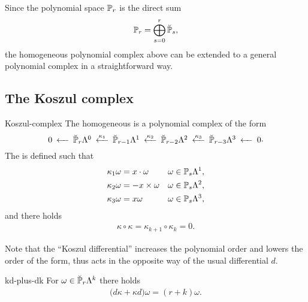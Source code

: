 \begin{remark}
  Since the polynomial space $\P_r$ is the direct sum
  \begin{gather*}
    \P_r = \bigoplus_{s=0}^r \breve\P_s,
  \end{gather*}
  the homogeneous polynomial complex above can be extended to a
  general polynomial complex in a straightforward way.
\end{remark}

\subsection{The Koszul complex}

\begin{Definition}{Koszul-complex}
  The homogeneous  is a polynomial complex of
  the form
  \begin{gather}\minCDarrowwidth15pt
    \label{eq:derham:12}
    \begin{CD}
      0
      @<<< \breve \P_r\Lambda^0
      @<{\kappa_1}<< \breve \P_{r-1}\Lambda^1
      @<{\kappa_2}<< \breve \P_{r-2}\Lambda^2
      @<{\kappa_3}<< \breve \P_{r-3}\Lambda^3
      @<<< 0
    \end{CD}.
  \end{gather}
  The  is defined such that
  \begin{gather}
    \label{eq:derham:13}
    \begin{aligned}
      \kappa_1\omega &= x\cdot\omega & \omega&\in \P_s\Lambda^1,\\
      \kappa_2\omega &= -x\times\omega & \omega&\in \P_s\Lambda^2,\\
      \kappa_3\omega &= x\omega & \omega&\in \P_s\Lambda^3,
    \end{aligned}
  \end{gather}
  and there holds
  \begin{gather}
    \label{eq:derham:14}
    \kappa\circ\kappa = \kappa_{k+1}\circ\kappa_k = 0.
  \end{gather}
\end{Definition}

Note that the ``Koszul differential'' increases the polynomial order
and lowers the order of the form, thus acts in the opposite way of the
usual differential $d$.

\begin{Lemma}{kd-plus-dk}
  For $\omega\in \breve \P_r\Lambda^k$ there holds
  \begin{gather}
    \label{eq:derham:15}
    \bigl(d\kappa+\kappa d\bigr)\omega = (r+k) \omega.
  \end{gather}
\end{Lemma}

